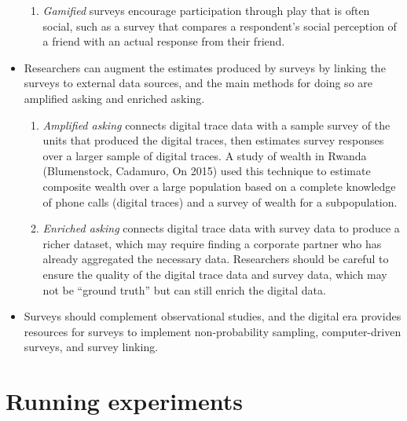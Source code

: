 \documentclass[11pt,letterpaper]{article}
\begin{document}
\begin{itemize}
\begin{enumerate}
\item \emph{Gamified} surveys encourage participation through play that is often social, such as a survey that compares a respondent's social perception of a friend with an actual response from their friend.
\end{enumerate}
\item Researchers can augment the estimates produced by surveys by linking the surveys to external data sources, and the main methods for doing so are amplified asking and enriched asking.
\begin{enumerate}
\item \emph{Amplified asking} connects digital trace data with a sample survey of the units that produced the digital traces, then estimates survey responses over a larger sample of digital traces. A study of wealth in Rwanda (Blumenstock, Cadamuro, On 2015) used this technique to estimate composite wealth over a large population based on a complete knowledge of phone calls (digital traces) and a survey of wealth for a subpopulation.
\item \emph{Enriched asking} connects digital trace data with survey data to produce a richer dataset, which may require finding a corporate partner who has already aggregated the necessary data. Researchers should be careful to ensure the quality of the digital trace data and survey data, which may not be ``ground truth'' but can still enrich the digital data.
\end{enumerate}
\item Surveys should complement observational studies, and the digital era provides resources for surveys to implement non-probability sampling, computer-driven surveys, and survey linking. 
\end{itemize}

\section{Running experiments}
\end{document}
